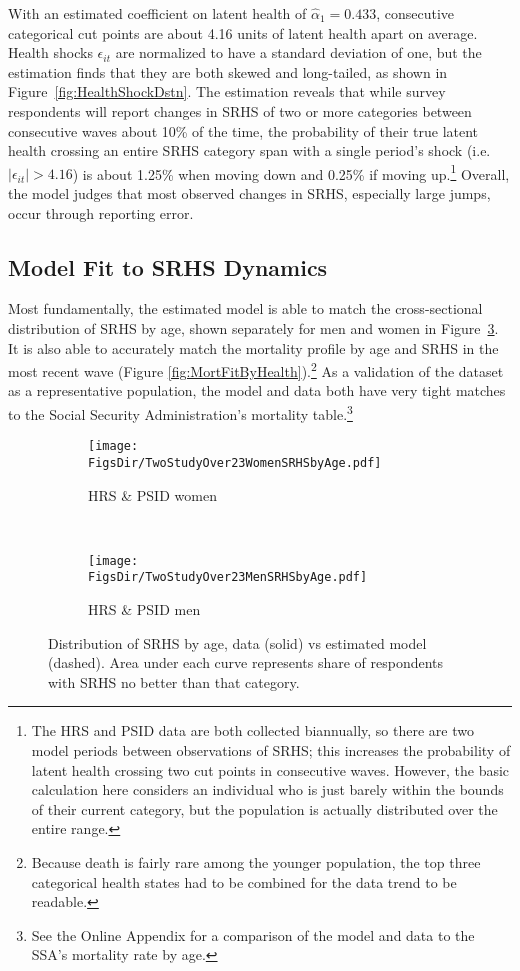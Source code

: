 \documentclass[12pt,pdftex,letterpaper]{article}
\newcommand{\LatentParam}{\alpha}
\newcommand{\HealthShock}{\epsilon}
\newcommand{\RootDir}{..}
\newcommand{\FigsDir}{\RootDir/Figures}
\begin{document}
With an estimated coefficient on latent health of $\hat{\LatentParam}_1 = 0.433$, consecutive categorical cut points are about 4.16 units of latent health apart on average. Health shocks $\HealthShock_{it}$ are normalized to have a standard deviation of one, but the estimation finds that they are both skewed and long-tailed, as shown in Figure~\ref{fig:HealthShockDstn}. The estimation reveals that while survey respondents will report changes in SRHS of two or more categories between consecutive waves about 10\% of the time, the probability of their true latent health crossing an entire SRHS category span with a single period's shock (i.e.\ $|\HealthShock_{it}| > 4.16$) is about 1.25\% when moving down and 0.25\% if moving up.\footnote{The HRS and PSID data are both collected biannually, so there are two model periods between observations of SRHS; this increases the probability of latent health crossing two cut points in consecutive waves. However, the basic calculation here considers an individual who is just barely within the bounds of their current category, but the population is actually distributed over the entire range.} Overall, the model judges that most observed changes in SRHS, especially large jumps, occur through reporting error.


\subsection{Model Fit to SRHS Dynamics}\label{sec:Fit}

Most fundamentally, the estimated model is able to match the cross-sectional distribution of SRHS by age, shown separately for men and women in Figure~\ref{fig:SRHSfitTwoStudy}. It is also able to accurately match the mortality profile by age and SRHS in the most recent wave (Figure \ref{fig:MortFitByHealth}).\footnote{Because death is fairly rare among the younger population, the top three categorical health states had to be combined for the data trend to be readable.} As a validation of the dataset as a representative population, the model and data both have very tight matches to the Social Security Administration's mortality table.\footnote{See the Online Appendix for a comparison of the model and data to the SSA's mortality rate by age.}

\begin{figure}
	\centering
	\begin{subfigure}[b]{0.48\textwidth}
		\texttt{[image: \\FigsDir/TwoStudyOver23WomenSRHSbyAge.pdf]}
		\caption{HRS \& PSID women}\label{fig:TwoStudyWomenSRHSfit}
	\end{subfigure}
	~
	\begin{subfigure}[b]{0.48\textwidth}
		\texttt{[image: \\FigsDir/TwoStudyOver23MenSRHSbyAge.pdf]}
		\caption{HRS \& PSID men}\label{fig:TwoStudyMenSRHSfit}
	\end{subfigure}
	\caption{Distribution of SRHS by age, data (solid) vs estimated model (dashed). Area under each curve represents share of respondents with SRHS no better than that category.}\label{fig:SRHSfitTwoStudy}
\end{figure}
\end{document}
